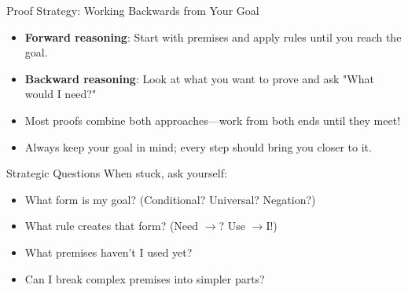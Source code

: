 \documentclass{beamer}
\begin{document}
	\begin{frame}{Proof Strategy: Working Backwards from Your Goal}
		\begin{itemize}
			\item \textbf{Forward reasoning}: Start with premises and apply rules until you reach the goal.
			\item \textbf{Backward reasoning}: Look at what you want to prove and ask "What would I need?"
			\item Most proofs combine both approaches—work from both ends until they meet!
			\item Always keep your goal in mind; every step should bring you closer to it.
		\end{itemize}
		
		\begin{block}{Strategic Questions}
			When stuck, ask yourself:
			\begin{itemize}
				\item What form is my goal? (Conditional? Universal? Negation?)
				\item What rule creates that form? (Need $\rightarrow$? Use $\rightarrow$I!)
				\item What premises haven't I used yet?
				\item Can I break complex premises into simpler parts?
			\end{itemize}
		\end{block}
	\end{frame}
	
\end{document}
